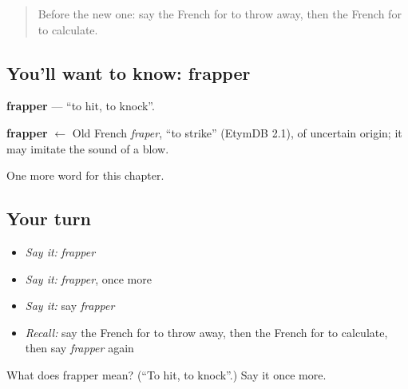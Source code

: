 \begin{quote}
Before the new one: say the French for to throw away, then the French for to calculate.
\end{quote}

\subsection*{You'll want to know: frapper}
\textbf{frapper} — \textquotedblleft{}to hit, to knock\textquotedblright{}.

\begin{cousinweb}
\textbf{frapper} $\leftarrow$ Old French \emph{fraper}, \textquotedblleft{}to strike\textquotedblright{} (EtymDB 2.1), of uncertain origin; it may imitate the sound of a blow.
\end{cousinweb}

\begin{grammarlens}[title={What you've built}]
One more word for this chapter.
\end{grammarlens}

\subsection*{Your turn}
\begin{itemize}
\raggedright
  \item \emph{Say it:} \emph{frapper}
  \item \emph{Say it:} \emph{frapper}, once more
  \item \emph{Say it:} say \emph{frapper}
  \item \emph{Recall:} say the French for to throw away, then the French for to calculate, then say \emph{frapper} again
\end{itemize}

\begin{tcolorbox}[breakable,colback=teal!4,colframe=teal!35!black,title={Before you move on}]
What does frapper mean? (\textquotedblleft{}To hit, to knock\textquotedblright{}.) Say it once more.
\end{tcolorbox}
